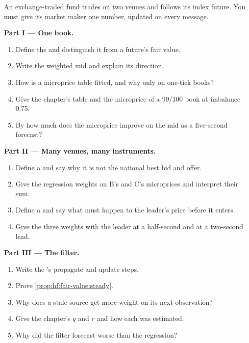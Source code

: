 \begin{problem}\label{pb:hf:fair-value:1}
An exchange-traded fund trades on two venues and follows its index future. You must give its market maker one number, updated on every message.

\medskip\noindent\textbf{Part I --- One book.}
\begin{enumerate}
\item Define the  and distinguish it from a future's fair value.
\item Write the weighted mid and explain its direction.
\item How is a microprice table fitted, and why only on one-tick books?
\item Give the chapter's table and the microprice of a 99/100 book at imbalance 0.75.
\item By how much does the microprice improve on the mid as a five-second forecast?
\end{enumerate}

\medskip\noindent\textbf{Part II --- Many venues, many instruments.}
\begin{enumerate}[resume]
\item Define a  and say why it is not the national best bid and offer.
\item Give the regression weights on B's and C's microprices and interpret their sum.
\item Define a  and say what must happen to the leader's price before it enters.
\item Give the three weights with the leader at a half-second and at a two-second lead.
\end{enumerate}

\medskip\noindent\textbf{Part III --- The filter.}
\begin{enumerate}[resume]
\item Write the 's propagate and update steps.
\item Prove \cref{prop:hf:fair-value:steady}.
\item Why does a stale source get more weight on its next observation?
\item Give the chapter's $q$ and $r$ and how each was estimated.
\item Why did the filter forecast worse than the regression?
\end{enumerate}


\end{problem}
